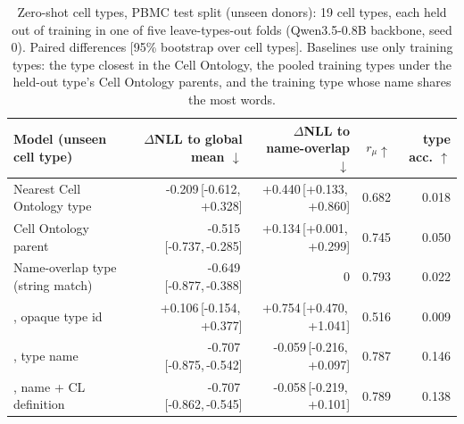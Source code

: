 \begin{table}[t]
\centering
\small
\setlength{\tabcolsep}{3.5pt}
\begin{tabular}{lrrrr}
\toprule
Model (unseen cell type) & $\Delta$NLL to global mean $\downarrow$ & $\Delta$NLL to name-overlap $\downarrow$ & $r_\mu\uparrow$ & type acc. $\uparrow$ \\
\midrule
Nearest Cell Ontology type & -0.209\,[-0.612,\,+0.328] & +0.440\,[+0.133,\,+0.860] & 0.682 & 0.018 \\
Cell Ontology parent & -0.515\,[-0.737,\,-0.285] & +0.134\,[+0.001,\,+0.299] & 0.745 & 0.050 \\
Name-overlap type (string match) & -0.649\,[-0.877,\,-0.388] & 0 & 0.793 & 0.022 \\
\rowcolor{ours}\cad{}, opaque type id & +0.106\,[-0.154,\,+0.377] & +0.754\,[+0.470,\,+1.041] & 0.516 & 0.009 \\
\rowcolor{ours}\cad{}, type name & -0.707\,[-0.875,\,-0.542] & -0.059\,[-0.216,\,+0.097] & 0.787 & 0.146 \\
\rowcolor{ours}\cad{}, name + CL definition & -0.707\,[-0.862,\,-0.545] & -0.058\,[-0.219,\,+0.101] & 0.789 & 0.138 \\
\bottomrule
\end{tabular}
\caption{Zero-shot cell types, PBMC test split (unseen donors): 19 cell types, each held out of training in one of five leave-types-out folds (Qwen3.5-0.8B backbone, seed 0). Paired differences [95\% bootstrap over cell types]. Baselines use only training types: the type closest in the Cell Ontology, the pooled training types under the held-out type's Cell Ontology parents, and the training type whose name shares the most words.}
\label{tab:zeroshot}
\end{table}
